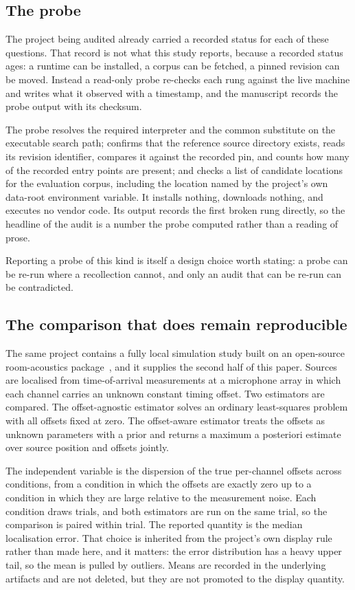 \subsection{The probe}

The project being audited already carried a recorded status for each of these
questions. That record is not what this study reports, because a recorded status
ages: a runtime can be installed, a corpus can be fetched, a pinned revision can
be moved. Instead a read-only probe re-checks each rung against the live machine
and writes what it observed with a timestamp, and the manuscript records the probe
output with its checksum.

The probe resolves the required interpreter and the common substitute on the
executable search path; confirms that the reference source directory exists,
reads its revision identifier, compares it against the recorded pin, and counts
how many of the recorded entry points are present; and checks a list of candidate
locations for the evaluation corpus, including the location named by the
project's own data-root environment variable. It installs nothing, downloads
nothing, and executes no vendor code. Its output records the first broken rung
directly, so the headline of the audit is a number the probe computed rather than
a reading of prose.

Reporting a probe of this kind is itself a design choice worth stating: a probe
can be re-run where a recollection cannot, and only an audit that can be re-run
can be contradicted.

\subsection{The comparison that does remain reproducible}

The same project contains a fully local simulation study built on an open-source
room-acoustics package~\cite{scheibler2018pyroomacoustics}, and it supplies the
second half of this paper. Sources are localised from time-of-arrival
measurements at a microphone array in which each channel carries an unknown
constant timing offset. Two estimators are compared. The offset-agnostic
estimator solves an ordinary least-squares problem with all offsets fixed at
zero. The offset-aware estimator treats the offsets as unknown parameters with a
prior and returns a maximum a posteriori estimate over source position and
offsets jointly.

The independent variable is the dispersion of the true per-channel offsets across
\NConditions{} conditions, from a condition in which the offsets are exactly zero
up to a condition in which they are large relative to the measurement noise. Each
condition draws \NTrials{} trials, and both estimators are run on the same trial,
so the comparison is paired within trial. The reported quantity is the median
localisation error. That choice is inherited from the project's own display
rule rather than made here, and it matters: the error distribution has a heavy
upper tail, so the mean is pulled by outliers. Means are recorded in the
underlying artifacts and are not deleted, but they are not promoted to the
display quantity.

